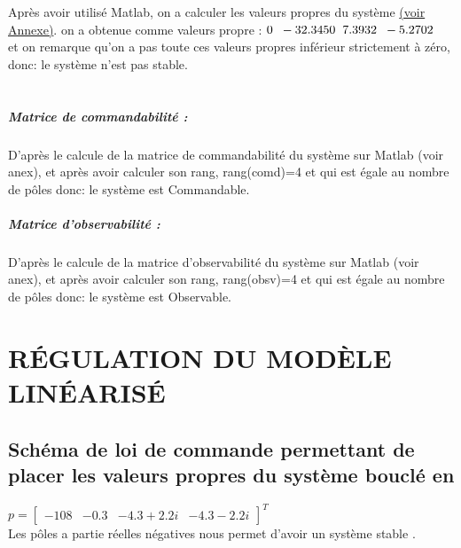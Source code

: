 \documentclass[12pt, a4paper, openany]{report}
\begin{document}
Après avoir utilisé Matlab, on a calculer les valeurs propres du système \hyperref[section1.11]{(voir Annexe)}\label{annexe11}. on a obtenue comme valeurs propre : $0 \hspace{2mm} -32.3450 \hspace{2mm} 7.3932 \hspace{2mm} -5.2702 $\\
et on remarque qu'on a pas toute ces valeurs propres inférieur strictement à zéro, donc: le système n'est pas stable.\\\\

\paragraph{Matrice de commandabilité :\\}

D'après le calcule de la matrice de commandabilité du système sur Matlab (voir anex), et après avoir calculer son rang, rang(comd)=4 et qui est égale au nombre de pôles donc: le système est Commandable.\\

\paragraph{Matrice d'observabilité :\\}
 
 D'après le calcule de la matrice d'observabilité du système sur Matlab (voir anex), et après avoir calculer son rang, rang(obsv)=4 et qui est égale au nombre de pôles donc: le système est Observable.\\
 
\chapter{RÉGULATION DU MODÈLE LINÉARISÉ}

     \section{Schéma de loi de commande permettant de placer les valeurs propres du système bouclé en}
  $p=
  \begin{bmatrix}
  -108&-0.3&-4.3+2.2i&-4.3-2.2i
  \end{bmatrix}^{T}$\\
  
  
   Les pôles a partie  réelles négatives nous permet d'avoir un système stable .\\
\end{document}
